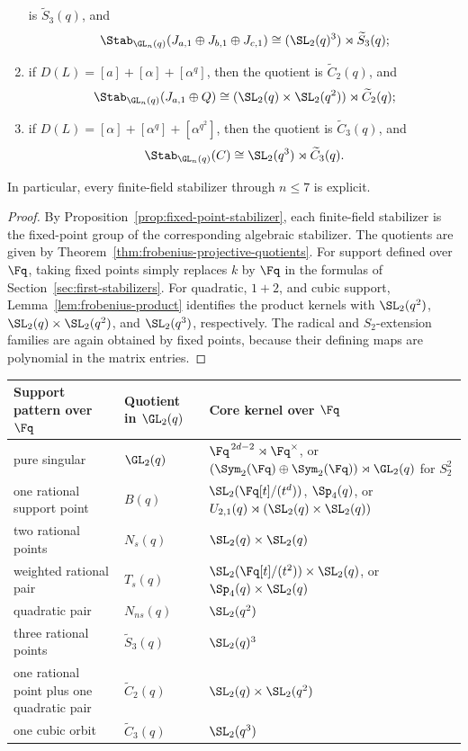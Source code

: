 \begin{theorem}
\begin{enumerate}[label=\arabic*.]
  is \(\widetilde{S}_3(q)\), and
  \[
    \Stab_{\GL_n(q)}(J_{a,1}\oplus J_{b,1}\oplus J_{c,1})
    \cong
    (\SL_2(q)^3)\rtimes \widetilde{S}_3(q);
  \]
\item if \(D(L)=[a]+[\alpha]+[\alpha^q]\), then the quotient is
  \(\widetilde{C}_2(q)\), and
  \[
    \Stab_{\GL_n(q)}(J_{a,1}\oplus Q)
    \cong
    (\SL_2(q)\times \SL_2(q^2))\rtimes \widetilde{C}_2(q);
  \]
\item if \(D(L)=[\alpha]+[\alpha^q]+[\alpha^{q^2}]\), then the quotient is
  \(\widetilde{C}_3(q)\), and
  \[
    \Stab_{\GL_n(q)}(C)\cong \SL_2(q^3)\rtimes \widetilde{C}_3(q).
  \]
\end{enumerate}
In particular, every finite-field stabilizer through \(n\leq 7\) is explicit.
\end{theorem}

\begin{proof}
By Proposition~\ref{prop:fixed-point-stabilizer}, each finite-field stabilizer
is the fixed-point group of the corresponding algebraic stabilizer. The
quotients are given by Theorem~\ref{thm:frobenius-projective-quotients}. For
support defined over \(\Fq\), taking fixed points simply replaces \(k\) by
\(\Fq\) in the formulas of Section~\ref{sec:first-stabilizers}. For quadratic,
\(1+2\), and cubic support, Lemma~\ref{lem:frobenius-product} identifies the
product kernels with \(\SL_2(q^2)\), \(\SL_2(q)\times \SL_2(q^2)\), and
\(\SL_2(q^3)\), respectively. The radical and \(S_2\)-extension families are
again obtained by fixed points, because their defining maps are polynomial in
the matrix entries.
\end{proof}

\begin{center}
\small
\begin{tabular}{L{0.22\textwidth} L{0.22\textwidth} L{0.36\textwidth}}
\toprule
Support pattern over \(\Fq\) & Quotient in \(\GL_2(q)\) & Core kernel over \(\Fq\) \\
\midrule
pure singular &
\(\GL_2(q)\) &
\(\Fq^{\,2d-2}\rtimes \Fq^\times\), or
\((\Sym_2(\Fq)\oplus \Sym_2(\Fq))\rtimes \GL_2(q)\) for \(S_2^2\) \\
one rational support point &
\(B(q)\) &
\(\SL_2(\Fq[t]/(t^d))\), \(\Sp_4(q)\), or
\(U_{2,1}(q)\rtimes (\SL_2(q)\times \SL_2(q))\) \\
two rational points &
\(N_s(q)\) &
\(\SL_2(q)\times \SL_2(q)\) \\
weighted rational pair &
\(T_s(q)\) &
\(\SL_2(\Fq[t]/(t^2))\times \SL_2(q)\), or
\(\Sp_4(q)\times \SL_2(q)\) \\
quadratic pair &
\(N_{ns}(q)\) &
\(\SL_2(q^2)\) \\
three rational points &
\(\widetilde{S}_3(q)\) &
\(\SL_2(q)^3\) \\
one rational point plus one quadratic pair &
\(\widetilde{C}_2(q)\) &
\(\SL_2(q)\times \SL_2(q^2)\) \\
one cubic orbit &
\(\widetilde{C}_3(q)\) &
\(\SL_2(q^3)\) \\
\bottomrule
\end{tabular}
\end{center}

